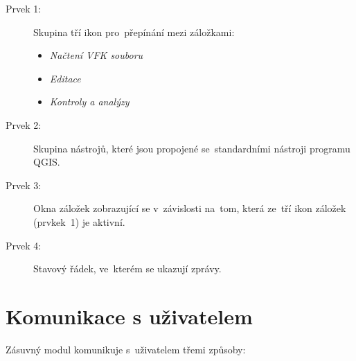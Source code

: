 \begin{description}
	\item[Prvek 1:] Skupina tří ikon pro~přepínání mezi záložkami:
	\begin{itemize}[leftmargin=1.5cm, noitemsep]
		\item {} \textit{Načtení VFK souboru}
		\item {} \textit{Editace}
		\item {} \textit{Kontroly a analýzy}
 	\end{itemize} 	
	\item[Prvek 2:] Skupina nástrojů, které jsou propojené se~standardními nástroji programu QGIS.
	\item[Prvek 3:] Okna záložek zobrazující se v~závislosti na~tom, která ze~tří ikon záložek (prvkek~1) je aktivní.
	\item[Prvek 4:] Stavový řádek, ve~kterém se ukazují zprávy.
\end{description}

\newpage

\section{Komunikace s uživatelem}
\label{manual_komunikace}

Zásuvný modul komunikuje s~uživatelem třemi způsoby:

